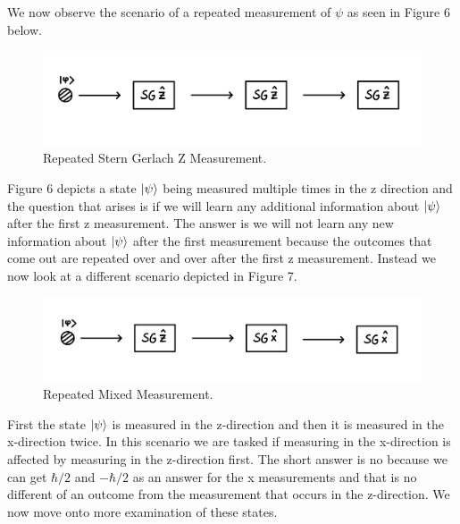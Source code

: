 \documentclass[twocolumn]{article}
\begin{document}
We now observe the scenario of a repeated measurement of $\psi$ as seen in Figure 6 below.
\begin{figure}[htpb]
\begin{center}
\includegraphics[width=0.90\linewidth]{SG-Measurement-Z-Three-Times.PNG}
\caption{Repeated Stern Gerlach Z Measurement.}
\end{center}
\end{figure}
\newline
Figure 6 depicts a state $\ket{\psi}$ being measured multiple times in the z direction and the question that arises is if we will learn any additional information about $\ket{\psi}$ after the first z measurement. The answer is we will not learn any new information about $\ket{\psi}$ after the first measurement because the outcomes that come out are repeated over and over after the first z measurement. Instead we now look at a different scenario depicted in Figure 7.
\begin{figure}[htpb]
\begin{center}
\includegraphics[width=0.90\linewidth]{SG-Measurement-Mixed.PNG}
\caption{Repeated Mixed Measurement.}
\end{center}
\end{figure}
\newline
First the state $\ket{\psi}$ is measured in the z-direction and then it is measured in the x-direction twice. In this scenario we are tasked if measuring in the x-direction is affected by measuring in the z-direction first. The short answer is no because we can get $\hbar/2$ and $-\hbar/2$ as an answer for the x measurements and that is no different of an outcome from the measurement that occurs in the z-direction. We now move onto more examination of these states.
\end{document}
